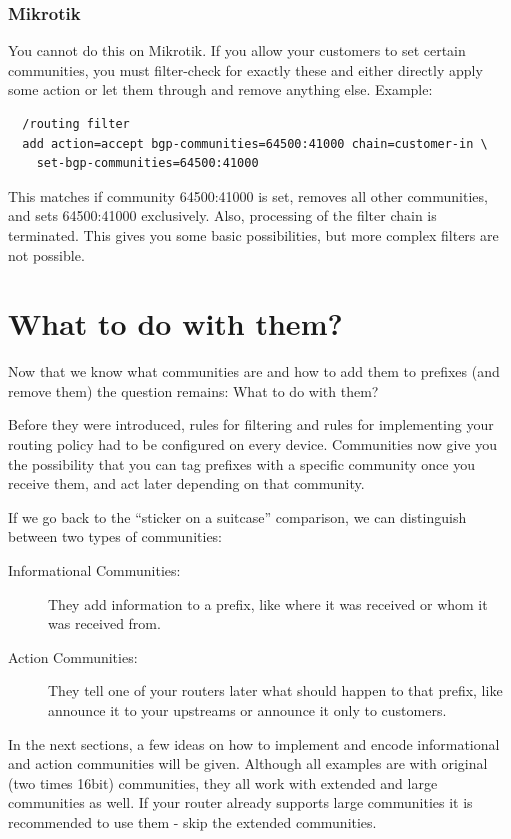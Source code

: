 \subsubsection{Mikrotik}
You cannot do this on Mikrotik. If you allow your customers to set certain communities, you must filter-check for exactly these and either directly apply some action or let them through and remove anything else. Example:
\begin{verbatim}
  /routing filter
  add action=accept bgp-communities=64500:41000 chain=customer-in \
    set-bgp-communities=64500:41000
\end{verbatim}
This matches if community 64500:41000 is set, removes all other communities, and sets 64500:41000 exclusively. Also, processing of the filter chain is terminated. This gives you some basic possibilities, but more complex filters are not possible.

\section{What to do with them?}
Now that we know what communities are and how to add them to prefixes (and remove them) the question remains: What to do with them?

Before they were introduced, rules for filtering and rules for implementing your routing policy had to be configured on every device. Communities now give you  the possibility that you can tag prefixes with a specific community once  you receive them, and act later depending on that community.

If we go back to the ``sticker on a suitcase'' comparison, we can distinguish between two types of communities:
\begin{description}
  \item[Informational Communities:] They add information to a prefix, like where it was received or whom it was received from.
  \item[Action Communities:] They tell one of your routers later what should happen to that prefix, like announce it to your upstreams or announce it only to customers.
\end{description}

In the next sections, a few ideas on how to implement and encode informational and action communities will be given. Although all examples are with original (two times 16bit) communities, they all work with extended and large communities as well. If your router already supports large communities it is recommended to use them - skip the extended communities.

